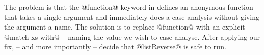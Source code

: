 The problem is that the @function@ keyword in \ocaml defines an
anonymous function that takes a single argument and immediately does a
case-analysis without giving the argument a name.
%
The solution is to replace @function@ with an explicit @match xs with@
-- naming the value we wish to case-analyse.
%
After applying our fix, \nanomaly -- and more importantly \ocaml --
decide that @listReverse@ is safe to run.
%






